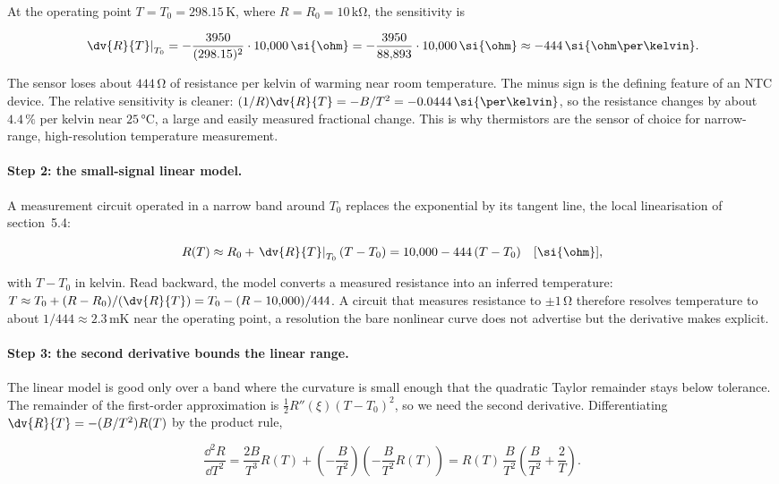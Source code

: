 At the operating point $T = T_{0} = 298.15\,\si{\kelvin}$, where
$R = R_{0} = 10\,\si{\kilo\ohm}$, the sensitivity is

\[
\left.\dv{R}{T}\right|_{T_{0}} = -\frac{3950}{(298.15)^{2}} \cdot
10{,}000\,\si{\ohm} = -\frac{3950}{88{,}893} \cdot 10{,}000\,
\si{\ohm} \approx -444\,\si{\ohm\per\kelvin}.
\]

The sensor loses about $444\,\si{\ohm}$ of resistance per kelvin of
warming near room temperature. The minus sign is the defining
feature of an NTC device. The relative sensitivity is cleaner: $(1/
R)\dv{R}{T} = -B/T^{2} = -0.0444\,\si{\per\kelvin}$, so the
resistance changes by about $4.4\,\%$ per kelvin near $25\,
\si{\degreeCelsius}$, a large and easily measured fractional
change. This is why thermistors are the sensor of choice for narrow-
range, high-resolution temperature measurement.

\paragraph{Step 2: the small-signal linear model.}
A measurement circuit operated in a narrow band around $T_{0}$
replaces the exponential by its tangent line, the local
linearisation of section~5.4:

\[
R(T) \approx R_{0} + \left.\dv{R}{T}\right|_{T_{0}} (T - T_{0}) =
10{,}000 - 444\,(T - T_{0})\quad[\si{\ohm}],
\]

with $T - T_{0}$ in kelvin. Read backward, the model converts a
measured resistance into an inferred temperature: $T \approx T_{0}
+ (R - R_{0})/(\dv{R}{T}) = T_{0} - (R - 10{,}000)/444$. A circuit
that measures resistance to $\pm 1\,\si{\ohm}$ therefore resolves
temperature to about $1/444 \approx 2.3\,\si{\milli\kelvin}$ near
the operating point, a resolution the bare nonlinear curve does not
advertise but the derivative makes explicit.

\paragraph{Step 3: the second derivative bounds the linear range.}
The linear model is good only over a band where the curvature is
small enough that the quadratic Taylor remainder stays below
tolerance. The remainder of the first-order approximation is
$\tfrac{1}{2} R''(\xi)(T - T_{0})^{2}$, so we need the second
derivative. Differentiating $\dv{R}{T} = -(B/T^{2}) R(T)$ by the
product rule,

\[
\frac{\dd^{2} R}{\dd T^{2}} = \frac{2B}{T^{3}} R(T) +
\left(-\frac{B}{T^{2}}\right)\!\left(-\frac{B}{T^{2}} R(T)\right)
= R(T)\,\frac{B}{T^{2}}\left(\frac{B}{T^{2}} + \frac{2}{T}\right).
\]

